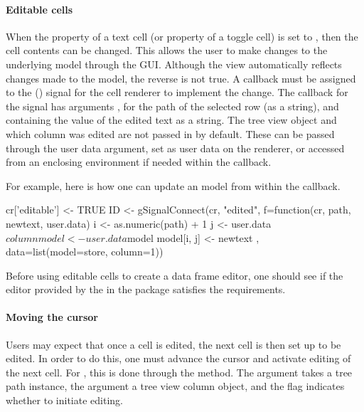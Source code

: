 \paragraph{Editable cells} When the  property of a text
cell (or  property of a toggle cell) is set to
, then the cell contents can be changed. This allows the
user to make changes to the underlying model through the GUI. Although
the view automatically reflects changes made to the model, the reverse
is not true. A callback must be assigned to the 
() signal for the cell renderer to implement the
change. The callback for the  signal has arguments
,  for the path of the selected row (as a
string), and  containing the value of the edited text
as a string. The tree view object and which column was edited are not
passed in by default. These can be passed through the user data
argument, set as user data on the renderer, or accessed from an
enclosing environment if needed within the callback.

For example, here is how one can update an  model
from within the callback.
\begin{Schunk}
\begin{Sinput}
 cr['editable'] <- TRUE
 ID <- gSignalConnect(cr, "edited", 
 f=function(cr, path, newtext, user.data) {
   i <- as.numeric(path) + 1
   j <- user.data$column
   model <- user.data$model
   model[i, j] <- newtext
 }, data=list(model=store, column=1))
\end{Sinput}
\end{Schunk}

Before using editable cells to create a data frame editor, one should
see if the editor provided by the  in the
 package satisfies the requirements.

\paragraph{Moving the cursor}

Users may expect that once a cell is edited, the next cell is then set
up to be edited. In order to do this, one must advance the cursor and
activate editing of the next cell. For , this is
done through the  method. The
 argument takes a tree path instance, the 
argument a tree view column object, and the flag 
indicates whether to initiate editing.


